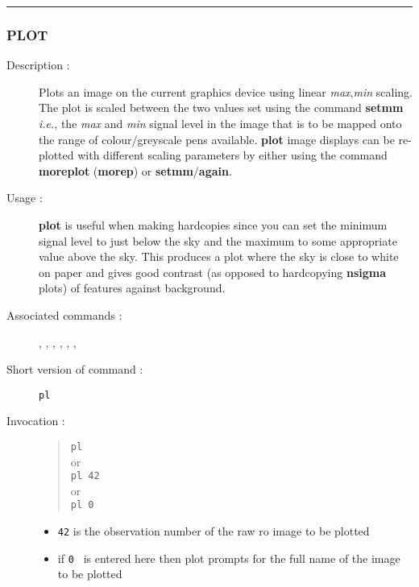 \hrule 
\subsubsection*{\label{PLOT}PLOT}

\begin{description}

\item[Description :] Plots an image on the current graphics device
using linear {\it max},{\it min} scaling.  The plot is scaled between
the two values set using the command {\bf setmm} \emph{i.e.}, the {\it max}
and {\it min} signal level in the image that is to be mapped onto the
range of colour/greyscale pens available.  {\bf plot} image displays can be
re-plotted with different scaling parameters by either using the
command {\bf moreplot} ({\bf morep}) or {\bf setmm}/{\bf again}.

\item[Usage :] {\bf plot} is useful when making hardcopies since you can set
the minimum signal level to just below the sky and the maximum to some
appropriate value above the sky.  This produces a plot where the sky is
close to white on paper and gives good contrast (as opposed to
hardcopying {\bf nsigma} plots) of features against background.

\item[Associated commands :] {\tt {}}, 
{\tt {}}, {\tt {}}, 
{\tt {}}, {\tt {}}, 
{\tt {}}, {\tt {}}

\item[Short version of command :] {\tt pl}
\item[Invocation :]

\begin{quote}{\tt  pl }\\
or \\
{\tt pl 42 }\\
or \\
{\tt pl 0 }
\end{quote}

\begin{itemize}
\item {\tt 42} is the observation number of the raw {\sc ro} image to be
plotted
\item if {\tt 0 } is entered here then plot prompts for the full name
 of the image to be plotted
\end{itemize}

\end{description}

